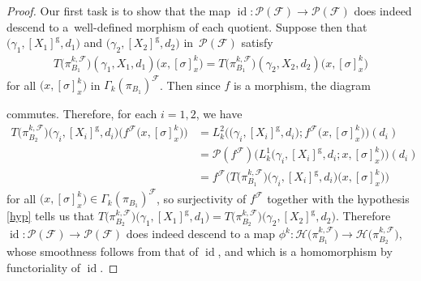 \documentclass[pdftex]{sigma}
\numberwithin{equation}{section}
\def\g{\operatorname{g}}
\def\id{\operatorname{id}}
\def\FF{{\mathcal{F}}}
\def\HH{{\mathcal{H}}}
\def\PP{{\mathcal{P}}}
\begin{document}
\begin{proof}
Our first task is to show that the map $\id\colon \PP(\FF)\rightarrow\PP(\FF)$ does indeed descend to a~well-defined morphism of each quotient. Suppose then that $\big(\gamma_{1},[X_{1}]^{\g},d_{1}\big)$ and $\big(\gamma_{2},[X_{2}]^{\g},d_{2}\big)$ in~$\PP(\FF)$ satisfy
\begin{gather}\label{hyp}
T\big(\pi_{B_{1}}^{k,\FF}\big)(\gamma_{1},X_{1},d_{1})\big(x,[\sigma]^{k}_{x}\big) =T\big(\pi_{B_{1}}^{k,\FF}\big)(\gamma_{2},X_{2},d_{2})\big(x,[\sigma]^{k}_{x}\big)
\end{gather}
for all $\big(x,[\sigma]_{x}^{k}\big)$ in $\Gamma_{k}(\pi_{B_{1}})^{\FF}$. Then since $f$ is a morphism, the diagram
\begin{center}
\end{center}
commutes. Therefore, for each $i = 1,2$, we have
\begin{align*}
T\big(\pi_{B_{2}}^{k,\FF}\big)\big(\gamma_{i},[X_{i}]^{\g},d_{i}\big)\big(f^{\FF}\big(x,[\sigma]^{k}_{x}\big)\big)
&= L_{k}^{2}\big(\big(\gamma_{i},[X_{i}]^{\g},d_{i}\big);f^{\FF}\big(x,[\sigma]^{k}_{x}\big)\big)(d_{i})
\\
&= \PP(f^{\FF})\big(L_{k}^{1}\big(\gamma_{i},[X_{i}]^{\g},d_{i};x,[\sigma]^{k}_{x}\big)\big)(d_{i})
\\
&= f^{\FF}\big(T\big(\pi_{B_{1}}^{k,\FF}\big)\big(\gamma_{i},[X_{i}]^{\g},d_{i}\big)\big(x,[\sigma]_{x}^{k}\big)\big)
\end{align*}
for all $\big(x,[\sigma]_{x}^{k}\big)\in\Gamma_{k}(\pi_{B_{1}})^{\FF}$, so surjectivity of $f^{\FF}$ together with the hypothesis \eqref{hyp} tells us that $T\big(\pi_{B_{2}}^{k,\FF}\big)\big(\gamma_{1},[X_{1}]^{\g},d_{1}\big) = T\big(\pi_{B_{2}}^{k,\FF}\big)\big(\gamma_{2},[X_{2}]^{\g},d_{2}\big)$. Therefore $\id\colon \PP(\FF)\rightarrow\PP(\FF)$ does indeed descend to a map $\phi^{k}\colon \HH\big(\pi_{B_{1}}^{k,\FF}\big)\rightarrow\HH\big(\pi_{B_{2}}^{k,\FF}\big)$, whose smoothness follows from that of $\id$, and which is a homomorphism by functoriality of $\id$.


\end{proof}
\end{document}
